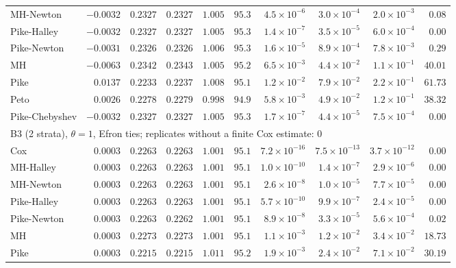 \begin{landscape}
\begin{longtable}{lrrrrrrrrr}
MH-Newton & $-0.0032$ & $0.2327$ & $0.2327$ & $1.005$ & $95.3$ & $4.5 \times 10^{-6}$ & $3.0 \times 10^{-4}$ & $2.0 \times 10^{-3}$ & $0.08$ \\
Pike-Halley & $-0.0032$ & $0.2327$ & $0.2327$ & $1.005$ & $95.3$ & $1.4 \times 10^{-7}$ & $3.5 \times 10^{-5}$ & $6.0 \times 10^{-4}$ & $0.00$ \\
Pike-Newton & $-0.0031$ & $0.2326$ & $0.2326$ & $1.006$ & $95.3$ & $1.6 \times 10^{-5}$ & $8.9 \times 10^{-4}$ & $7.8 \times 10^{-3}$ & $0.29$ \\
MH & $-0.0063$ & $0.2342$ & $0.2343$ & $1.005$ & $95.2$ & $6.5 \times 10^{-3}$ & $4.4 \times 10^{-2}$ & $1.1 \times 10^{-1}$ & $40.01$ \\
Pike & $0.0137$ & $0.2233$ & $0.2237$ & $1.008$ & $95.1$ & $1.2 \times 10^{-2}$ & $7.9 \times 10^{-2}$ & $2.2 \times 10^{-1}$ & $61.73$ \\
Peto & $0.0026$ & $0.2278$ & $0.2279$ & $0.998$ & $94.9$ & $5.8 \times 10^{-3}$ & $4.9 \times 10^{-2}$ & $1.2 \times 10^{-1}$ & $38.32$ \\
Pike-Chebyshev & $-0.0032$ & $0.2327$ & $0.2327$ & $1.005$ & $95.3$ & $1.7 \times 10^{-7}$ & $4.4 \times 10^{-5}$ & $7.5 \times 10^{-4}$ & $0.00$ \\
\multicolumn{10}{l}{B3 (2 strata), $\theta = 1$, Efron ties; replicates without a finite Cox estimate: 0} \\
Cox & $0.0003$ & $0.2263$ & $0.2263$ & $1.001$ & $95.1$ & $7.2 \times 10^{-16}$ & $7.5 \times 10^{-13}$ & $3.7 \times 10^{-12}$ & $0.00$ \\
MH-Halley & $0.0003$ & $0.2263$ & $0.2263$ & $1.001$ & $95.1$ & $1.0 \times 10^{-10}$ & $1.4 \times 10^{-7}$ & $2.9 \times 10^{-6}$ & $0.00$ \\
MH-Newton & $0.0003$ & $0.2263$ & $0.2263$ & $1.001$ & $95.1$ & $2.6 \times 10^{-8}$ & $1.0 \times 10^{-5}$ & $7.7 \times 10^{-5}$ & $0.00$ \\
Pike-Halley & $0.0003$ & $0.2263$ & $0.2263$ & $1.001$ & $95.1$ & $5.7 \times 10^{-10}$ & $9.9 \times 10^{-7}$ & $2.4 \times 10^{-5}$ & $0.00$ \\
Pike-Newton & $0.0003$ & $0.2263$ & $0.2262$ & $1.001$ & $95.1$ & $8.9 \times 10^{-8}$ & $3.3 \times 10^{-5}$ & $5.6 \times 10^{-4}$ & $0.02$ \\
MH & $0.0003$ & $0.2273$ & $0.2273$ & $1.001$ & $95.1$ & $1.1 \times 10^{-3}$ & $1.2 \times 10^{-2}$ & $3.4 \times 10^{-2}$ & $18.73$ \\
Pike & $0.0003$ & $0.2215$ & $0.2215$ & $1.011$ & $95.2$ & $1.9 \times 10^{-3}$ & $2.4 \times 10^{-2}$ & $7.1 \times 10^{-2}$ & $30.19$ \\

\end{longtable}
\end{landscape}
